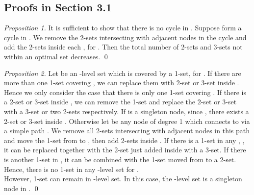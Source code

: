 \documentclass[runningheads,a4paper]{llncs}
\numberwithin{equation}{section}
\begin{document}
\begin{figure}
\begin{center}
\caption{}
\end{center}
\end{figure}

\subsection{Proofs in Section 3.1}

\begin{proof}[Proposition 1]
It is sufficient to show that there is no cycle in . Suppose  form a cycle in . We remove the 2-sets intersecting with adjacent nodes in the cycle and add the 2-sets inside each , for . Then the total number of 2-sets and 3-sets not within an optimal set decreases. \qed
\end{proof}

\begin{proof}[Proposition 2]
Let  be an -level set which is covered by a 1-set, for . If there are more than one 1-set covering , we can replace them with 2-set or 3-set inside . Hence we only consider the case that there is only one 1-set covering . If there is a 2-set or 3-set inside , we can remove the 1-set and replace the 2-set or 3-set with a 3-set or two 2-sets respectively. If  is a singleton node, since , there exists a 2-set or 3-set inside . Otherwise let  be any node of degree 1 which connects to  via a simple path . We remove all 2-sets intersecting with adjacent nodes in this path and move the 1-set from  to , then add 2-sets inside . If there is a 1-set in any , , it can be replaced together with the 2-set just added inside  with a 3-set. If there is another 1-set in , it can be combined with the 1-set moved from  to a 2-set. Hence, there is no 1-set in any -level set for . \\ However, 1-set can remain in -level set. In this case, the -level set is a singleton node in . \qed
\end{proof}
\end{document}
